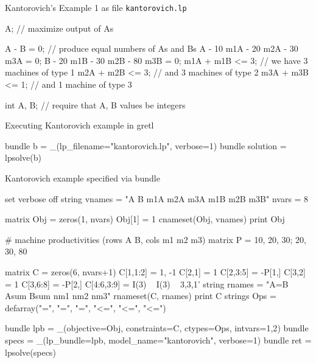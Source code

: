 \documentclass{article}
\begin{document}
\begin{script}[htbp]
  \caption{Kantorovich's Example 1 as file \texttt{kantorovich.lp}}
  \label{ls:kantor-lp}
\begin{scode}
A; // maximize output of As

A - B = 0; // produce equal numbers of As and Bs
A - 10 m1A - 20 m2A - 30 m3A = 0;
B - 20 m1B - 30 m2B - 80 m3B = 0;
m1A + m1B <= 3; // we have 3 machines of type 1
m2A + m2B <= 3; // and 3 machines of type 2
m3A + m3B <= 1; // and 1 machine of type 3

int A, B; // require that A, B values be integers
\end{scode}
\end{script}

\begin{script}[htbp]
  \caption{Executing Kantorovich example in gretl}
  \label{ls:kantor-inp}
\begin{scode}
bundle b = _(lp_filename="kantorovich.lp", verbose=1)
bundle solution = lpsolve(b)
\end{scode}
\end{script}

\begin{script}[htbp]
  \caption{Kantorovich example specified via bundle}
  \label{ls:kantor-bundle}
\begin{scode}
set verbose off
string vnames = "A B m1A m2A m3A m1B m2B m3B"
nvars = 8

matrix Obj = zeros(1, nvars)
Obj[1] = 1
cnameset(Obj, vnames)
print Obj

# machine productivities (rows A B, cols m1 m2 m3)
matrix P = {10, 20, 30; 20, 30, 80}

matrix C = zeros(6, nvars+1)
C[1,1:2] = {1, -1}
C[2,1] = 1
C[2,3:5] = -P[1,]
C[3,2] = 1
C[3,6:8] = -P[2,]
C[4:6,3:9] = I(3) ~ I(3) ~ {3,3,1}'
string rnames = "A=B Asum Bsum nm1 nm2 nm3"
rnameset(C, rnames)
print C
strings Ops = defarray("=", "=", "=", "<=", "<=", "<=")

bundle lpb = _(objective=Obj, constraints=C, ctypes=Ops, intvars={1,2})
bundle specs = _(lp_bundle=lpb, model_name="kantorovich", verbose=1)
bundle ret = lpsolve(specs)
\end{scode}
\end{script}
\end{document}
